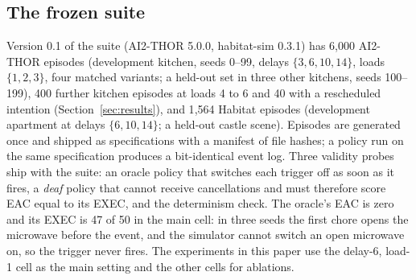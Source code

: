 \subsection{The frozen suite}
\label{sec:suite}

Version 0.1 of the suite (AI2-THOR 5.0.0, habitat-sim 0.3.1) has 6{,}000
AI2-THOR episodes (development kitchen,
seeds 0--99, delays $\{3,6,10,14\}$, loads $\{1,2,3\}$, four matched variants; a held-out
set in three other kitchens, seeds 100--199), 400 further kitchen episodes
at loads 4 to 6 and 40 with a rescheduled intention (Section~\ref{sec:results}),
and 1{,}564 Habitat episodes
(development apartment at delays $\{6,10,14\}$; a held-out castle scene).
Episodes are generated once and shipped as specifications with a manifest
of file hashes; a policy run on the same specification produces a
bit-identical event log. Three validity probes ship with the suite: an
oracle policy that switches each trigger off as soon as it fires, a
\emph{deaf} policy that cannot receive cancellations and must therefore
score EAC equal to its EXEC, and the determinism check. The oracle's EAC is
zero and its EXEC is 47 of 50 in the main cell: in three seeds the first
chore opens the microwave before the event, and the simulator cannot switch
an open microwave on, so the trigger never fires. The experiments in this paper use
the delay-6, load-1 cell as the main setting and the other cells for
ablations.
